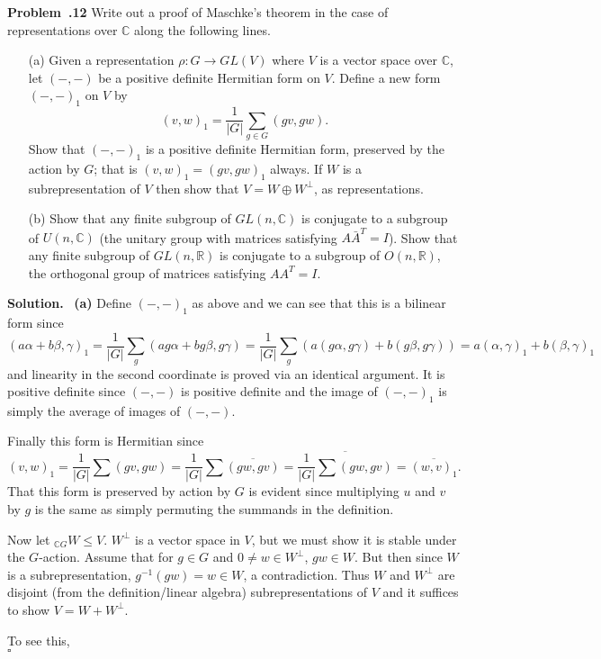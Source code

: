 \documentclass[12pt]{article}
\newcommand*{\R}{
\mathbb{R}
}
\newcommand*{\C}{
\mathbb{C}
}
\newenvironment{prob}[1]{\par\smallskip
	\noindent\begin{mdframed}\small \textbf{Problem~\thesection.#1} \rmfamily\quad}{\end{mdframed}\medskip}
\newenvironment{sol}{\noindent \textbf{Solution.} \,}{\\\hspace*{\fill}$\square$\medskip}
\begin{document}
\begin{prob}{12}
	Write out a proof of Maschke's theorem in the case of representations over $\C$ along the following lines.
	\begin{itemize}
		\item[(a)] Given a representation $\rho:G\to GL(V)$ where $V$ is a vector space over $\C$, let $(-,-)$ be a positive definite Hermitian form on $V$. Define a new form $(-,-)_1$ on $V$ by
		\[(v,w)_1=\frac{1}{|G|}\sum_{g\in G}(gv,gw).\]
		Show that $(-,-)_1$ is a positive definite Hermitian form, preserved by the action by $G$; that is $(v,w)_1=(gv,gw)_1$ always. If $W$ is a subrepresentation of $V$ then show that $V=W\oplus W^\perp$, as representations.
		\item[(b)] Show that any finite subgroup of $GL(n,\C)$ is conjugate to a subgroup of $U(n,\C)$ (the unitary group with matrices satisfying $A\bar A^T=I$). Show that any finite subgroup of $GL(n,\R)$ is conjugate to a subgroup of $O(n,\R)$, the orthogonal group of matrices satisfying $AA^T=I$.
	\end{itemize}
	
\end{prob}
\begin{sol}
	\textbf{(a)}\hspace{1ex} Define $(-,-)_1$ as above and we can see that this is a bilinear form since
	\[(a\alpha+b\beta,\gamma)_1=\frac{1}{|G|}\sum_g (ag\alpha+bg\beta,g\gamma)=\frac{1}{|G|}\sum_g\left(a(g\alpha,g\gamma)+b(g\beta,g\gamma)\right)
	= a(\alpha,\gamma)_1+b(\beta,\gamma)_1\]
	and linearity in the second coordinate is proved via an identical argument. It is positive definite since $(-,-)$ is positive definite and the image of $(-,-)_1$ is simply the average of images of $(-,-).$
	
	Finally this form is Hermitian since 
	\[(v,w)_1=\frac{1}{|G|}\sum (gv,gw)=\frac{1}{|G|}\sum\overline{(gw,gv)}=\overline{\frac{1}{|G|}\sum(gw,gv)}=\overline{(w,v)_1}.\]
	That this form is preserved by action by $G$ is evident since multiplying $u$ and $v$ by $g$ is the same as simply permuting the summands in the definition.
	
	Now let $_{\C G}W\le V$. $W^\perp$ is a vector space in $V$, but we must show it is stable under the $G$-action. Assume that for $g\in G$ and $0\ne w\in W^\perp$, $gw\in W.$ But then since $W$ is a subrepresentation, $g^{-1}(gw)=w\in W$, a contradiction. Thus $W$ and $W^\perp$ are disjoint (from the definition/linear algebra) subrepresentations of $V$ and it suffices to show $V=W+W^\perp$.
	
	To see this,
\end{sol}
\end{document}

